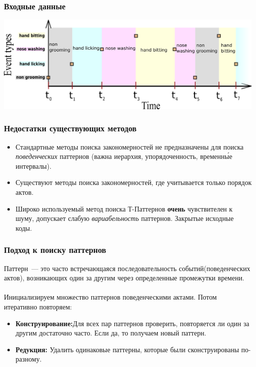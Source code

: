 \documentclass[smaller]{beamer}
\begin{document}
\begin{frame}	
 \frametitle{Входные данные}

\includegraphics[scale=0.5]{beh_data.eps}

\end{frame}

\begin{frame}
  \frametitle{Недостатки существующих методов}
  \begin{itemize}
   \item Стандартные методы поиска закономерностей не предназначены для поиска {\em поведенческих} паттернов
    (важна иерархия, упорядоченность, временн\'{ы}е интервалы).
   \item Существуют методы поиска закономерностей, где учитывается только порядок актов.
   \item Широко используемый метод поиска Т-Паттернов {\bf очень} чувствителен к шуму, допускает слабую \emph{вариабельность} паттернов. 
      Закрытые исходные коды.
  \end{itemize}
\end{frame}


\begin{frame}	
  \frametitle{Подход к поиску паттернов}
Паттерн~--- это часто встречающаяся последовательность событий(поведенческих актов), возникающих один за другим 
через определенные промежутки времени.
\\~\\
  Инициализируем множество паттернов поведенческими актами. Потом итеративно повторяем:
  \begin{itemize}
   \item {\bf Конструирование:}Для всех пар паттернов проверить, повторяется ли один за другим достаточно часто. Если да, 
	то получаем новый паттерн. 
   \item {\bf Редукция:} Удалить одинаковые паттерны, которые были сконструированы по-разному.
  \end{itemize}
\end{frame}
\end{document}
